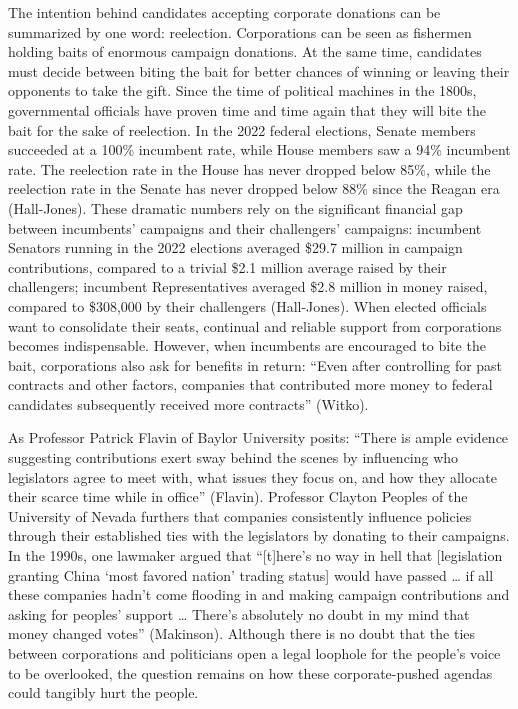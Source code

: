 \documentclass[12pt, a4paper, twoside]{article}
\begin{document}
The intention behind candidates accepting corporate donations can be summarized by one word: reelection. Corporations can be seen as fishermen holding baits of enormous campaign donations. At the same time, candidates must decide between biting the bait for better chances of winning or leaving their opponents to take the gift. Since the time of political machines in the 1800s, governmental officials have proven time and time again that they will bite the bait for the sake of reelection. In the 2022 federal elections, Senate members succeeded at a 100\% incumbent rate, while House members saw a 94\% incumbent rate. The reelection rate in the House has never dropped below 85\%, while the reelection rate in the Senate has never dropped below 88\% since the Reagan era (Hall-Jones). These dramatic numbers rely on the significant financial gap between incumbents’ campaigns and their challengers’ campaigns: incumbent Senators running in the 2022 elections averaged \$29.7 million in campaign contributions, compared to a trivial \$2.1 million average raised by their challengers; incumbent Representatives averaged \$2.8 million in money raised, compared to \$308,000 by their challengers (Hall-Jones). When elected officials want to consolidate their seats, continual and reliable support from corporations becomes indispensable. However, when incumbents are encouraged to bite the bait, corporations also ask for benefits in return: “Even after controlling for past contracts and other factors, companies that contributed more money to federal candidates subsequently received more contracts” (Witko).

As Professor Patrick Flavin of Baylor University posits: “There is ample evidence suggesting contributions exert sway behind the scenes by influencing who legislators agree to meet with, what issues they focus on, and how they allocate their scarce time while in office” (Flavin).  Professor Clayton Peoples of the University of Nevada furthers that companies consistently influence policies through their established ties with the legislators by donating to their campaigns. In the 1990s, one lawmaker argued that “[t]here’s no way in hell that [legislation granting China ‘most favored nation’ trading status] would have passed … if all these companies hadn’t come flooding in and making campaign contributions and asking for peoples’ support … There’s absolutely no doubt in my mind that money changed votes” (Makinson). Although there is no doubt that the ties between corporations and politicians open a legal loophole for the people’s voice to be overlooked, the question remains on how these corporate-pushed agendas could tangibly hurt the people. 
\end{document}
